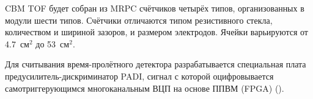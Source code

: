 CBM TOF будет собран из MRPC счётчиков четырёх типов, организованных в модули шести типов.
Счётчики отличаются типом резистивного стекла, количеством и шириной зазоров, и размером электродов. Ячейки варьируются от 4.7~см$^2$ до 53~см$^2$.

Для считывания время-пролётного детектора разрабатывается специальная плата предусилитель-дискриминатор PADI, сигнал с которой оцифровывается самотриггерующимся многоканальным ВЦП на основе ППВМ (FPGA) (\cite{PADI}).


